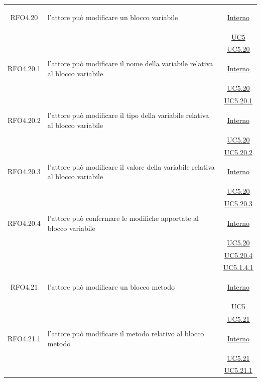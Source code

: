 \begin{longtable}{|c|>{\centering}m{7cm}|c|}
\hypertarget{RFO4.20}{RFO4.20} & l'attore può modificare un blocco variabile &  \hyperlink{Interno}{Interno}\\
& &\hyperref[UC5]{UC5}\\
& &\hyperref[UC5.20]{UC5.20}\\ \hline

\hypertarget{RFO4.20.1}{RFO4.20.1} & l'attore può modificare il nome della variabile relativa al blocco variabile &  \hyperlink{Interno}{Interno}\\
& &\hyperref[UC5.20]{UC5.20}\\
& &\hyperref[UC5.20.1]{UC5.20.1}\\ \hline

\hypertarget{RFO4.20.2}{RFO4.20.2} & l'attore può modificare il tipo della variabile relativa al blocco variabile &  \hyperlink{Interno}{Interno}\\
& &\hyperref[UC5.20]{UC5.20}\\
& &\hyperref[UC5.20.2]{UC5.20.2}\\ \hline

\hypertarget{RFO4.20.3}{RFO4.20.3} & l'attore può modificare il valore della variabile relativa al blocco variabile &  \hyperlink{Interno}{Interno}\\
& &\hyperref[UC5.20]{UC5.20}\\
& &\hyperref[UC5.20.3]{UC5.20.3}\\ \hline

\hypertarget{RFO4.20.4}{RFO4.20.4} & l'attore può confermare le modifiche apportate al blocco variabile &  \hyperlink{Interno}{Interno}\\
& &\hyperref[UC5.20]{UC5.20}\\
& &\hyperref[UC5.20.4]{UC5.20.4}\\
& &\hyperref[UC5.1.4.1]{UC5.1.4.1}\\ \hline

\hypertarget{RFO4.21}{RFO4.21} & l'attore può modificare un blocco metodo &  \hyperlink{Interno}{Interno}\\
& &\hyperref[UC5]{UC5}\\
& &\hyperref[UC5.21]{UC5.21}\\ \hline

\hypertarget{RFO4.21.1}{RFO4.21.1} & l'attore può modificare il metodo relativo al blocco metodo &  \hyperlink{Interno}{Interno}\\
& &\hyperref[UC5.21]{UC5.21}\\
& &\hyperref[UC5.21.1]{UC5.21.1}\\ \hline


\end{longtable}
